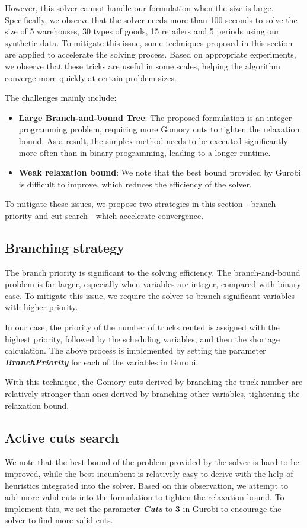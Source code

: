 \documentclass[a4paper,12pt]{article}
\begin{document}
However, this solver cannot handle our formulation when the size is large.
Specifically, we observe that the solver needs more than 100 seconds to solve the size of 5 warehouses, 30 types of goods, 15 retailers and 5 periods using our synthetic data.
To mitigate this issue, some techniques proposed in this section are applied to accelerate the solving process.
Based on appropriate experiments, we observe that these tricks are useful in some scales, helping the algorithm converge more quickly at certain problem sizes.

The challenges mainly include:
\begin{itemize}
    \item \textbf{Large Branch-and-bound Tree}: The proposed formulation is an integer programming problem, requiring more Gomory cuts to tighten the relaxation bound.
    As a result, the simplex method needs to be executed significantly more often than in binary programming, leading to a longer runtime.
    \item \textbf{Weak relaxation bound}: We note that the best bound provided by Gurobi is difficult to improve, which reduces the efficiency of the solver.
\end{itemize}

To mitigate these issues, we propose two strategies in this section - branch priority and cut search - which accelerate convergence.

\subsection{Branching strategy}\label{subsec:branching-strategy}
The branch priority is significant to the solving efficiency.
The branch-and-bound problem is far larger, especially when variables are integer, compared with binary case.
To mitigate this issue, we require the solver to branch significant variables with higher priority.

In our case, the priority of the number of trucks rented is assigned with the highest priority, followed by the scheduling variables, and then the shortage calculation.
The above process is implemented by setting the parameter \textbf{\textit{BranchPriority}} for each of the variables in Gurobi.

With this technique, the Gomory cuts derived by branching the truck number are relatively stronger than ones derived by branching other variables, tightening the relaxation bound.

\subsection{Active cuts search}\label{subsec:active-cuts-search}
We note that the best bound of the problem provided by the solver is hard to be improved, while the best incumbent is relatively easy to derive with the help of heuristics integrated into the solver.
Based on this observation, we attempt to add more valid cuts into the formulation to tighten the relaxation bound.
To implement this, we set the parameter \textbf{\textit{Cuts}} to \textbf{3} in Gurobi to encourage the solver to find more valid cuts.
\end{document}

